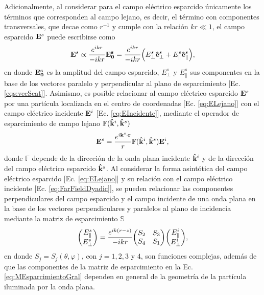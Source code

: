 Adicionalmente, al considerar para el campo eléctrico esparcido  únicamente los términos que corresponden al campo lejano, es decir, el término con componentes transversales, que decae como $r^{-1}$ y cumple con la relación $kr\ll 1$, el campo esparcido $\vb{E}^s$ puede escribirse como \cite{bohren1998absorption} \vspace*{-1em}
	\begin{align}
	\vb{E}^s \propto \frac{e^{ikr}}{-ikr}\vb{E_0^s}
			=  \frac{e^{ikr}}{-ikr}
			\qty( E_{\perp}^s  \vu{e}_{\perp}^s + E_{\parallel}^s \vu{e}_{\parallel}^s), \label{eq:ELejano}
	\end{align}
en donde  $\vb{E_0^s}$ es la amplitud del campo esparcido,  $ E_{\perp}^s$ y  $ E_{\parallel}^s$ sus componentes en la base de los vectores paralelo y perpendicular al plano de esparcimiento [Ec. \eqref{eqs:vecScat}]. Asimismo, es posible relacionar al campo eléctrico esparcido $\vb{E}^s$ por una partícula localizada en el centro de coordenadas  [Ec. \eqref{eq:ELejano}] con el  campo eléctrico incidente $\vb{E}^i$ [Ec. \eqref{eq:EIncidente}],  mediante el operador de esparcimiento de campo lejano  $\mathbb{F}(\vu{k}^i,\vu{k}^s)$  \cite{tsang2000scattering}
	\begin{align}
	\vb{E}^s = \frac{e^{i\vb{k}^s\cdot\vb{r}}}{r}\mathbb{F}(\vu{k}^i,\vu{k}^s)\vb{E}^i,
	\label{eq:FarFieldDyadic}
	\end{align}
donde $\mathbb{F}$ depende de la dirección de la onda plana incidente $\vu{k}^i$ y de la dirección del campo eléctrico esparcido $\vu{k}^s$. Al considerar la forma asintótica del campo eléctrico esparcido [Ec. \eqref{eq:ELejano}] y su relación con el campo eléctrico incidente [Ec. \eqref{eq:FarFieldDyadic}], se pueden relacionar las componentes perpendiculares del campo esparcido y el campo incidente de una onda plana en la base de los vectores perpendiculares y paralelos al plano de incidencia mediante la matriz de esparcimiento $\mathbb{S}$  \cite{bohren1998absorption} \vspace*{-1em}
	\begin{align}
	\mqty(E_{\parallel}^s\\E_{\perp}^s) = 
		\frac{e^{ik(r-z)}}{-ikr} \mqty(S_2&S_3\\S_4&S_1)
	\mqty(E_{\parallel}^i\\E_{\perp}^i),\label{eq:MEsparcimientoGral}
	\end{align}
en donde $S_j = S_j(\theta,\varphi)$, con $j=1,2,3$ y $4$, son funciones complejas, además de que las componentes de la matriz de esparcimiento en la Ec. \eqref{eq:MEsparcimientoGral} dependen en general de la geometría de la partícula iluminada por la onda plana.
